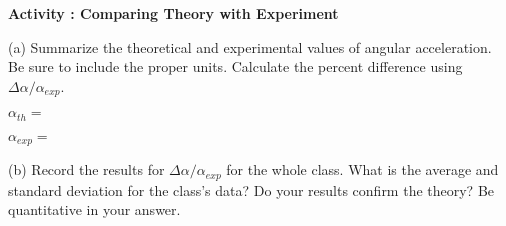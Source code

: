 \newpage


\textbf{Activity  : Comparing Theory with Experiment }

(a) Summarize the theoretical and experimental values of angular acceleration. Be sure to include the proper units. Calculate the percent difference using $\Delta\alpha/\alpha_{exp}$.
\vspace{10mm}

\( \alpha _{th}= \)
\vspace{10mm}

\( \alpha _{exp}= \) 
\vspace{15mm}

(b) Record the results for $\Delta\alpha/\alpha_{exp}$ for the whole class. What is the average and standard deviation for the class's data?
Do your results confirm the theory? Be quantitative in your answer.

